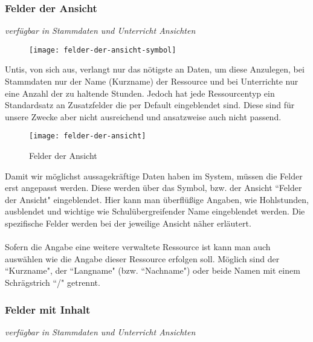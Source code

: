\subsubsection{Felder der Ansicht}
{\small\textit{verfügbar in Stammdaten und Unterricht Ansichten\\}\par}

\begin{wrapfigure}{r}{.05\textwidth}
	\vspace{-50pt}
	\texttt{[image: felder-der-ansicht-symbol]}
	\vspace{-35pt}
\end{wrapfigure}

\noindent
Untis, von sich aus, verlangt nur das nötigste an Daten, um diese Anzulegen, bei Stammdaten nur der Name (Kurzname) der Ressource und bei Unterrichte nur eine Anzahl der zu haltende Stunden. Jedoch hat jede Ressourcentyp ein Standardsatz an Zusatzfelder die per Default eingeblendet sind. Diese sind für unsere Zwecke aber nicht ausreichend und ansatzweise auch nicht passend.

\begin{wrapfigure}{r}{0.4\textwidth}
	\texttt{[image: felder-der-ansicht]}
	\vspace{-15pt}
	\caption{Felder der Ansicht}
	\label{fig:felder-der-ansicht}
	\vspace{10pt}
\end{wrapfigure}

\noindent
Damit wir möglichst aussagekräftige Daten haben im System, müssen die Felder erst angepasst werden. Diese werden über das Symbol, bzw. der Ansicht ``Felder der Ansicht" eingeblendet. Hier kann man überflüßige Angaben, wie Hohlstunden, ausblendet und wichtige wie Schulübergreifender Name eingeblendet werden. Die spezifische Felder werden bei der jeweilige Ansicht näher erläutert.\\
\\
Sofern die Angabe eine weitere verwaltete Ressource ist kann man auch auswählen wie die Angabe dieser Ressource erfolgen soll. Möglich sind der ``Kurzname", der ``Langname" (bzw. ``Nachname") oder beide Namen mit einem Schrägstrich ``/" getrennt.\\

\subsubsection{Felder mit Inhalt}
{\small\textit{verfügbar in Stammdaten und Unterricht Ansichten\\}\par}

